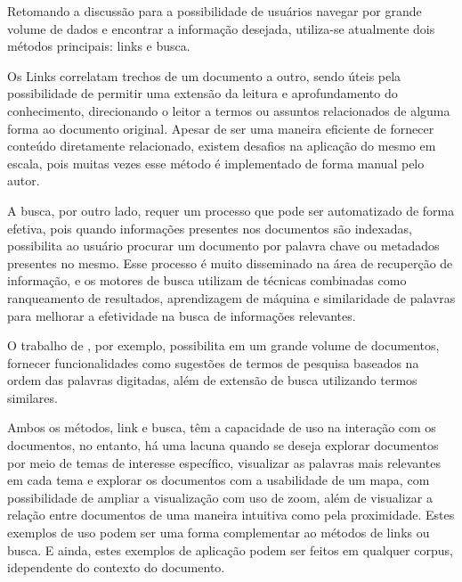 \documentclass[12pt,a4paper]{article}
\begin{document}
 
 Retomando a discussão para a possibilidade de usuários navegar por grande volume de dados e encontrar a informação desejada, utiliza-se atualmente dois métodos principais:
 links e busca. 
 
 Os Links correlatam trechos de um documento a outro, sendo úteis pela possibilidade de permitir uma extensão da leitura e aprofundamento do conhecimento,
 direcionando o leitor a termos ou assuntos relacionados de alguma forma ao documento original. Apesar de ser uma maneira eficiente de fornecer conteúdo diretamente relacionado,
 existem desafios na aplicação do mesmo em escala, pois muitas vezes esse método é implementado de forma manual pelo autor. 
 
 A busca, por outro lado,
 requer um processo que pode ser automatizado de forma efetiva, pois quando informações presentes nos documentos são indexadas, possibilita ao usuário procurar um documento por palavra chave ou metadados presentes no mesmo.
 Esse processo é muito disseminado na área de recuperção de informação, e os motores de busca utilizam de técnicas combinadas como ranqueamento de resultados, aprendizagem de máquina e similaridade de palavras para melhorar a efetividade na busca de informações relevantes.

 O trabalho de , por exemplo, possibilita em um grande volume de documentos, fornecer funcionalidades como sugestões de termos de pesquisa baseados na ordem das palavras digitadas, além de extensão de busca utilizando termos similares.

Ambos os métodos, link e busca, têm a capacidade de uso na interação com os documentos, no entanto, há uma lacuna quando se deseja explorar documentos por meio de temas de interesse específico,
 visualizar as palavras mais relevantes em cada tema e explorar os documentos com a usabilidade de um mapa, com possibilidade de ampliar a visualização com uso de zoom, além de visualizar a relação entre documentos de uma maneira intuitiva como pela proximidade. Estes exemplos de uso podem ser uma forma complementar ao métodos de links ou busca. E ainda, estes exemplos de aplicação podem ser feitos em qualquer corpus, idependente do contexto do documento.
 
\end{document}
